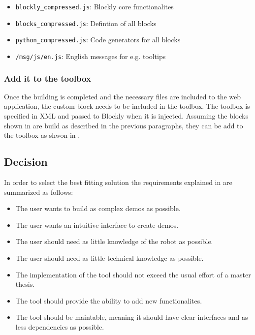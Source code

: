 \begin{itemize}
	\item \lstinline!blockly_compressed.js!: Blockly core functionalites
	\item \lstinline!blocks_compressed.js!: Defintion of all blocks
	\item \lstinline!python_compressed.js!: Code generators for all blocks
	\item \lstinline!/msg/js/en.js!: English messages for e.g. tooltips
\end{itemize}

\subsubsection{Add it to the toolbox}
Once the building is completed and the necessary files are included to the web application, the custom block needs to be included in the toolbox. The toolbox is specified in XML and passed to Blockly when it is injected. Assuming the blocks shown in  are build as described in the previous paragraphs, they can be add to the toolbox as shwon in . \\

\begin{figure}[htbp]
	
\end{figure}

\subsection{Decision}
In order to select the best fitting solution the requirements explained in  are summarized as follows:

\begin{itemize}
	\item The user wants to build as complex demos as possible.
	\item The user wants an intuitive interface to create demos.
	\item The user should need as little knowledge of the robot as possible.
	\item The user should need as little technical knowledge as possible.
	\item The implementation of the tool should not exceed the usual effort of a master thesis.
	\item The tool should provide the ability to add new functionalites.
	\item The tool should be maintable, meaning it should have clear interfaces and as less dependencies as possible.
\end{itemize}

